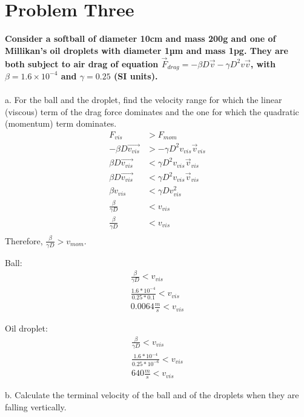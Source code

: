 \documentclass[10pt]{article} %
\begin{document}
\vspace{1 cm}       

\section{Problem Three}
\textbf{Consider a softball of diameter 10cm and mass 200g and one of Millikan’s oil droplets 
with  diameter  1µm  and  mass  1pg.  They  are  both subject  to  air  drag  of  equation
$\vec{F}_{drag} = −\beta D\vec{v} −\gamma D^2v\vec{v}$, with $\beta = 1.6 \times 10^{−4}$ and $\gamma = 0.25$ (SI units).} \\ \\

a. For  the  ball  and  the  droplet,  find  the  velocity  range  for  which  the  linear  (viscous) 
term of the drag force dominates and the one for which the quadratic (momentum) 
term dominates.\\

\begin{align}
  F_{vis} &> F_{mom}\\
  -\beta D\vec{v_{vis}} &> -\gamma D^2v_{vis}\vec{v}_{vis}\\
  \beta D\vec{v_{vis}} &< \gamma D^2v_{vis}\vec{v}_{vis}\\
  \beta D\vec{v_{vis}} &< \gamma D^2v_{vis}\vec{v}_{vis}\\
  \beta v_{vis} &< \gamma Dv^2_{vis}\\
  \frac{\beta}{\gamma D} &< v_{vis}\\
  \frac{\beta}{\gamma D} &< v_{vis}\\
\end{align}
Therefore, $\frac{\beta}{\gamma D}  > v_{mom}$.

Ball:
\begin{align}
  \frac{\beta}{\gamma D} < v_{vis}\\
  \frac{1.6*10^{-4}}{0.25*0.1} < v_{vis}\\
  0.0064 \frac{m}{s} < v_{vis}
\end{align}

Oil droplet:
\begin{align}
  \frac{\beta}{\gamma D} < v_{vis}\\
  \frac{1.6*10^{-4}}{0.25*10^{-6}} < v_{vis}\\
  640 \frac{m}{s} < v_{vis}
\end{align}

b. Calculate the terminal velocity of the ball and of the droplets when they are falling 
vertically.\\
\end{document}
